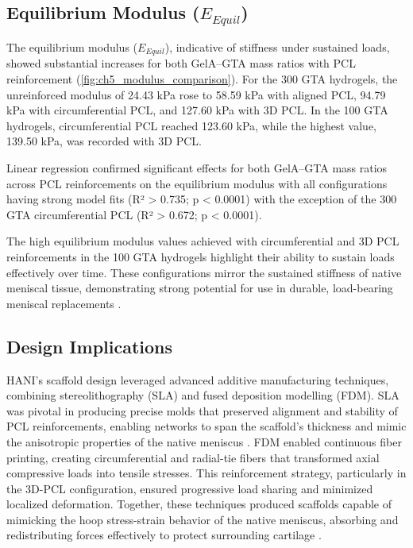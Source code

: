 \subsection{Equilibrium Modulus ($E_{Equil}$)}

The equilibrium modulus ($E_{Equil}$), indicative of stiffness under sustained loads, showed substantial increases for both GelA--GTA mass ratios with PCL reinforcement (\autoref{fig:ch5_modulus_comparison}). For the 300 GTA hydrogels, the unreinforced modulus of 24.43 kPa rose to 58.59 kPa with aligned PCL, 94.79 kPa with circumferential PCL, and 127.60 kPa with 3D PCL. In the 100 GTA hydrogels, circumferential PCL reached 123.60 kPa, while the highest value, 139.50 kPa, was recorded with 3D PCL.

Linear regression confirmed significant effects for both GelA--GTA mass ratios across PCL reinforcements on the equilibrium modulus with all configurations having strong model fits (R² > 0.735; p < 0.0001) with the exception of the 300 GTA circumferential PCL (R² > 0.672; p < 0.0001).

The high equilibrium modulus values achieved with circumferential and 3D PCL reinforcements in the 100 GTA hydrogels highlight their ability to sustain loads effectively over time. These configurations mirror the sustained stiffness of native meniscal tissue, demonstrating strong potential for use in durable, load-bearing meniscal replacements \cite{a.murphy20243dprintedvariable,bahcecioglu20193dprinted,boschetti2004biomechanicalproperties,patel2019systematicreview}.


\subsection{Design Implications}

HANI's scaffold design leveraged advanced additive manufacturing techniques, combining stereolithography (SLA) and fused deposition modelling (FDM). SLA was pivotal in producing precise molds that preserved alignment and stability of PCL reinforcements, enabling networks to span the scaffold's thickness and mimic the anisotropic properties of the native meniscus \cite{filardo2019patientspecificmeniscus,klarmann20233dprinting,bahcecioglu20193dprinted,ngo2018additivemanufacturing}. FDM enabled continuous fiber printing, creating circumferential and radial-tie fibers that transformed axial compressive loads into tensile stresses. This reinforcement strategy, particularly in the 3D-PCL configuration, ensured progressive load sharing and minimized localized deformation. Together, these techniques produced scaffolds capable of mimicking the hoop stress-strain behavior of the native meniscus, absorbing and redistributing forces effectively to protect surrounding cartilage \cite{filardo2019patientspecificmeniscus,guo20213dprintedcellfree,armiento2018biomaterialsarticular,patel2019systematicreview}.


